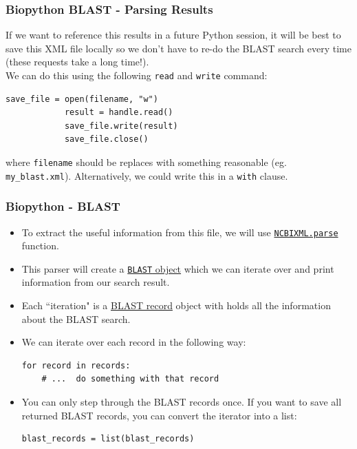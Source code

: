 \documentclass[xcolor=svgnames]{beamer}
\newcommand{\nl}{\\[1em]}
\newcommand{\ft}[1]{\frametitle{#1}}
\begin{document}
\begin{frame}[fragile]\ft{Biopython BLAST - Parsing Results}
If we want to reference this results in a future Python session, it will be best to save this XML file locally so we don't have to re-do the BLAST search every time (these requests take a long time!).\nl
  We can do this using the following {\tt read} and {\tt write} command:
\begin{Verbatim}[frame=single]
            save_file = open(filename, "w")
            result = handle.read()
            save_file.write(result)
            save_file.close()
\end{Verbatim}
where {\tt filename} should be replaces with something reasonable (eg. {\tt my\_blast.xml}).  Alternatively, we could write this in a {\tt with} clause.\nl


\end{frame}


\begin{frame}[fragile]\ft{Biopython - BLAST}
\begin{itemize}
\item To extract the useful information from this file, we will use \href{https://biopython.org/DIST/docs/api/Bio.Blast.NCBIXML-module.html}{\tt NCBIXML.parse} function.  
\item This parser will create a \href{https://biopython.org/DIST/docs/api/Bio.Blast.Record.Blast-class.html}{\texttt{BLAST} object} which we can iterate over and print information from our search result. %
\item Each ``iteration" is a \href{http://biopython.org/DIST/docs/api/Bio.Blast.Record-module.html}{BLAST record} object with holds all the information about the BLAST search.
\item We can iterate over each record in the following way:
\begin{Verbatim}[frame=single]
for record in records:     
	# ...  do something with that record
\end{Verbatim}
\item You can only step through the BLAST records  once. %
If you want to save all returned BLAST records, you can convert the iterator into a list:
\begin{Verbatim}[frame=single]
blast_records = list(blast_records)
\end{Verbatim}
\end{itemize}
\end{frame}
\end{document}

